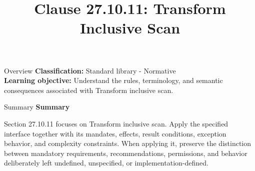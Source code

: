 \documentclass[10pt,letterpaper]{article}
\title{Clause 27.10.11: Transform Inclusive Scan}
\author{}
\date{}
\begin{document}
\maketitle
\begin{CornellOverviewBox}{Overview}
\textbf{Classification:} Standard library - Normative\\[2pt]
\textbf{Learning objective:} Understand the rules, terminology, and semantic consequences associated with Transform inclusive scan.
\end{CornellOverviewBox}\begin{CornellSummaryBox}{Summary}
{\sffamily\bfseries\color{Accent} Summary}\par\vspace{3pt}Section 27.10.11 focuses on Transform inclusive scan. Apply the specified interface together with its mandates, effects, result conditions, exception behavior, and complexity constraints. When applying it, preserve the distinction between mandatory requirements, recommendations, permissions, and behavior deliberately left undefined, unspecified, or implementation-defined.
\end{CornellSummaryBox}
\end{document}

